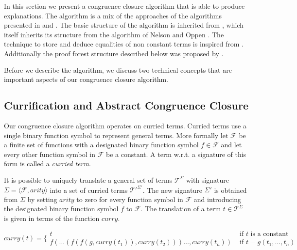 %
In this section we present a congruence closure algorithm that is able to produce explanations.
The algorithm is a mix of the approaches of the algorithms presented in \cite{Fontaine2004} and \cite{Nieuwenhuis2005,Nieuwenhuis2007}.
The basic structure of the algorithm is inherited from \cite{Fontaine2004}, which itself inherits its structure from the algorithm of Nelson and Oppen \cite{Nelson1980}.
The technique to store and deduce equalities of non constant terms is inspired from \cite{Nieuwenhuis2005,Nieuwenhuis2007}.
Additionally the proof forest structure described below was proposed by \cite{Nieuwenhuis2005,Nieuwenhuis2007}.

Before we describe the algorithm, we discuss two technical concepts that are important aspects of our congruence closure algorithm.

\subsection*{Currification and Abstract Congruence Closure}
\label{subsec:algorithms_preliminaries}

Our congruence closure algorithm operates on curried terms.
Curried terms use a single binary function symbol to represent general terms.
More formally let $\mathcal{F}$ be a finite set of functions with a designated binary function symbol $f \in \mathcal{F}$ and let every other function symbol in $\mathcal{F}$ be a constant.
A term w.r.t. a signature of this form is called a \emph{curried term}.

It is possible to uniquely translate a general set of terms $\mathcal{T}^{\Sigma}$ with signature $\Sigma = \langle \mathcal{F},arity \rangle$ into a set of curried terms $\mathcal{T'}^{\Sigma'}$.
The new signature $\Sigma'$ is obtained from $\Sigma$ by setting $arity$ to zero for every function symbol in $\mathcal{F}$ and introducing the designated binary function symbol $f$ to $\mathcal{F}$.
The translation of a term $t \in \mathcal{T}^{\Sigma}$ is given in terms of the function $curry$.

$$
curry(t) = \Big\{
\begin{array}{ll}
	t & \text{ if } t \text{ is a constant }\\
	f(\ldots (f(f(g,curry(t_1)),curry(t_2)))\ldots,curry(t_n)) &\text{ if } t = g(t_1,\ldots, t_n)
\end{array}
$$

